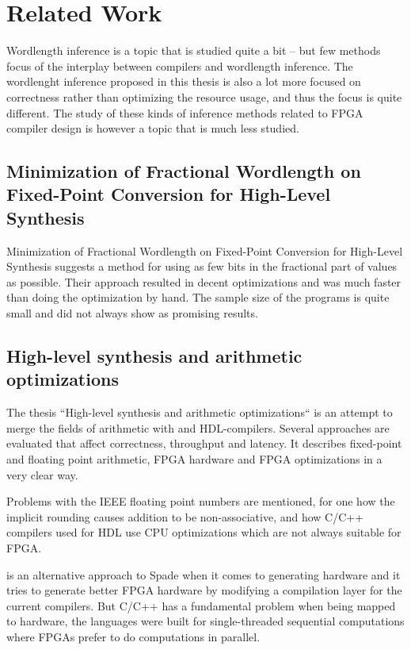 \chapter{Related Work}
Wordlength inference is a topic that is studied quite a bit -- but few methods focus of the interplay between compilers and wordlength inference. The wordlenght inference proposed in this thesis is also a lot more focused on correctness rather than optimizing the resource usage, and thus the focus is quite different. The study of these kinds of inference methods related to FPGA compiler design is however a topic that is much less studied.

\section{Minimization of Fractional Wordlength on Fixed-Point Conversion for High-Level Synthesis}
Minimization of Fractional Wordlength on Fixed-Point Conversion for High-Level Synthesis suggests a method for using as few bits in the fractional part of values as possible. Their approach resulted in decent optimizations and was much faster than doing the optimization by hand. The sample size of the programs is quite small and did not always show as promising results.

\cite{src:MinOfFrac}

\section{High-level synthesis and arithmetic optimizations}
The thesis ``High-level synthesis and arithmetic optimizations`` is an attempt to merge the fields of arithmetic with and HDL-compilers. Several approaches are evaluated that affect correctness, throughput and latency. It describes fixed-point and floating point arithmetic, FPGA hardware and FPGA optimizations in a very clear way.

Problems with the IEEE floating point numbers are mentioned, for one how the implicit rounding causes addition to be non-associative, and how C/C++ compilers used for HDL use CPU optimizations which are not always suitable for FPGA.

\citeauthor{src:HLSandOpt} is an alternative approach to Spade when it comes to generating hardware and it tries to generate better FPGA hardware by modifying a compilation layer for the current compilers. But C/C++ has a fundamental problem when being mapped to hardware, the languages were built for single-threaded sequential computations where FPGAs prefer to do computations in parallel.

